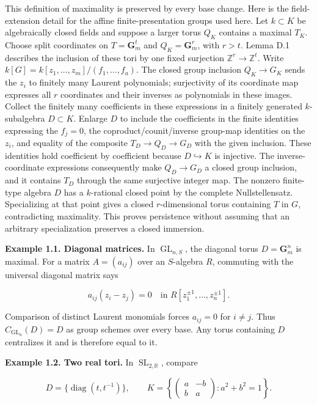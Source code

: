 \documentclass[11pt,a4paper,openany]{report}
\begin{document}
This definition of maximality is preserved by every base change. Here is the field-extension detail for the affine finite-presentation groups used here. Let \(k\subset K\) be algebraically closed fields and suppose a larger torus \(Q_K\) contains a maximal \(T_K\). Choose split coordinates on \(T=\mathbf G_m^t\) and \(Q_K=\mathbf G_m^r\), with \(r>t\). Lemma D.1 describes the inclusion of these tori by one fixed surjection \(\mathbb Z^r\to\mathbb Z^t\). Write \(k[G]=k[z_1,\ldots,z_m]/(f_1,\ldots,f_a)\). The closed group inclusion \(Q_K\to G_K\) sends the \(z_i\) to finitely many Laurent polynomials; surjectivity of its coordinate map expresses all \(r\) coordinates and their inverses as polynomials in these images. Collect the finitely many coefficients in these expressions in a finitely generated \(k\)-subalgebra \(D\subset K\). Enlarge \(D\) to include the coefficients in the finite identities expressing the \(f_j=0\), the coproduct/counit/inverse group-map identities on the \(z_i\), and equality of the composite \(T_D\to Q_D\to G_D\) with the given inclusion. These identities hold coefficient by coefficient because \(D\hookrightarrow K\) is injective. The inverse-coordinate expressions consequently make \(Q_D\to G_D\) a closed group inclusion, and it contains \(T_D\) through the same surjective integer map. The nonzero finite-type algebra \(D\) has a \(k\)-rational closed point by the complete Nullstellensatz. Specializing at that point gives a closed \(r\)-dimensional torus containing \(T\) in \(G\), contradicting maximality. This proves persistence without assuming that an arbitrary specialization preserves a closed immersion.

\textbf{Example 1.1. Diagonal matrices.} In \(\operatorname{GL}_{n,S}\), the diagonal torus \(D=\mathbf G_m^n\) is maximal. For a matrix \(A=(a_{ij})\) over an \(S\)-algebra \(R\), commuting with the universal diagonal matrix says

\[
a_{ij}(z_i-z_j)=0\quad\text{in }R[z_1^{\pm1},\ldots,z_n^{\pm1}].
\]

Comparison of distinct Laurent monomials forces \(a_{ij}=0\) for \(i\ne j\). Thus \(C_{\operatorname{GL}_n}(D)=D\) as group schemes over every base. Any torus containing \(D\) centralizes it and is therefore equal to it.

\textbf{Example 1.2. Two real tori.} In \(\operatorname{SL}_{2,\mathbb R}\), compare

\[
D=\{\operatorname{diag}(t,t^{-1})\},\qquad
K=\left\{\begin{pmatrix}a&-b\\b&a\end{pmatrix}:a^2+b^2=1\right\}.
\]
\end{document}
